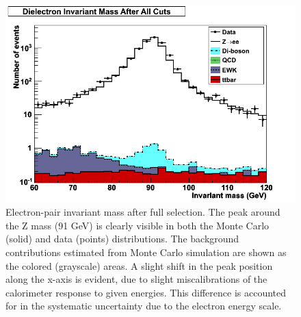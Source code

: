 


 \begin{figure}[htb]
  \begin{center}
    \includegraphics[width=360pt]{Figures/invMass-04Apr11.png}
  \end{center}
  \caption[\fixspacing Electron-pair invariant mass after full selection]
  {\fixspacing Electron-pair invariant mass after full selection.
    The peak around the Z mass (91 GeV) is clearly visible
    in both the Monte Carlo (solid) and data (points) distributions.
    The background contributions estimated from Monte Carlo simulation
    are shown as the colored (grayscale) areas.
    A slight shift in the peak position along the x-axis is
    evident, due to slight miscalibrations of
    the calorimeter response to given energies.
    This difference is accounted for in the
    systematic uncertainty due to the electron energy scale.
  }
  \label{fig:InvMass}
 \end{figure}


